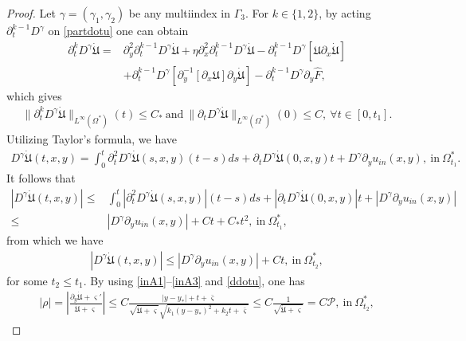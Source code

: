 \documentclass{amsart}
\numberwithin{equation}{section}
\begin{document}
\begin{proof}
Let $\gamma=(\gamma_{1},\gamma_{2})$ be any multiindex in $\Gamma_{3}$.
For $k\in\{1,2\}$, by acting $\partial_{t}^{k-1}D^{\gamma}$ on \eqref{partdotu} one can obtain
\begin{align*}
\partial_{t}^{k}D^{\gamma}\dot{\mathfrak{U}}
=& \partial_{y}^{2}\partial_{t}^{k-1}D^{\gamma}\dot{\mathfrak{U}}
  +\eta\partial_{x}^{2}\partial_{t}^{k-1}D^{\gamma}\dot{\mathfrak{U}}
  -\partial_{t}^{k-1}D^{\gamma}[\mathfrak{U}\partial_{x}\dot{\mathfrak{U}}]\\
 &+\partial_{t}^{k-1}D^{\gamma}[\partial_{y}^{-1}[\partial_{x}\mathfrak{U}]\partial_{y}\dot{\mathfrak{U}}]
  -\partial_{t}^{k-1}D^{\gamma}\partial_{y}\hat{F},\nonumber
\end{align*}
which gives
\begin{align*}
\|\partial_{t}^{k}D^{\gamma}\dot{\mathfrak{U}}\|_{L^{\infty}(\Omega^{*})}(t)\leq C_{*}~\text{and}~
\|\partial_{t}D^{\gamma}\dot{\mathfrak{U}}\|_{L^{\infty}(\Omega^{*})}(0)\leq C,~\forall t\in[0,t_{1}].
\end{align*}
Utilizing Taylor's formula, we have
\begin{align*}
D^{\gamma}\dot{\mathfrak{U}}(t,x,y)
= \int_{0}^{t}\partial_{t}^{2}D^{\gamma}\dot{\mathfrak{U}}(s,x,y)(t-s)ds
 +\partial_{t}D^{\gamma}\dot{\mathfrak{U}}(0,x,y)t
 +D^{\gamma}\partial_{y}u_{in}(x,y),~\text{in}~\Omega_{t_{1}}^{*}.
\end{align*}
It follows that
\begin{align*}
|D^{\gamma}\dot{\mathfrak{U}}(t,x,y)|
\leq& \int_{0}^{t}|\partial_{t}^{2}D^{\gamma}\dot{\mathfrak{U}}(s,x,y)|(t-s)ds
 +|\partial_{t}D^{\gamma}\dot{\mathfrak{U}}(0,x,y)|t
 +|D^{\gamma}\partial_{y}u_{in}(x,y)|\\
\leq& |D^{\gamma}\partial_{y}u_{in}(x,y)|+Ct+C_{*}t^{2},~\text{in}~\Omega_{t_{1}}^{*},
\end{align*}
from which we have
\begin{align}\label{ddotu}
|D^{\gamma}\dot{\mathfrak{U}}(t,x,y)|\leq |D^{\gamma}\partial_{y}u_{in}(x,y)|+Ct,~\text{in}~\Omega_{t_{2}}^{*},
\end{align}
for some $t_{2}\leq t_{1}$. By using \eqref{inA1}--\eqref{inA3} and \eqref{ddotu}, one has
\begin{align}\label{partrho}
|\rho|=\left|\frac{\partial_{y}\dot{\mathfrak{U}}+\varsigma'}{\dot{\mathfrak{U}}+\varsigma}\right|
\leq C\frac{|y-y_{*}|+t+\bar{\varsigma}}{\sqrt{\dot{\mathfrak{U}}+\varsigma}\sqrt{k_{1}(y-y_{*})^{2}+k_{2}t+\bar{\varsigma}}}
\leq C\frac{1}{\sqrt{\dot{\mathfrak{U}}+\varsigma}}
=C\mathcal{P},~\text{in}~\Omega_{t_{2}}^{*},

\end{align}
\end{proof}
\end{document}
